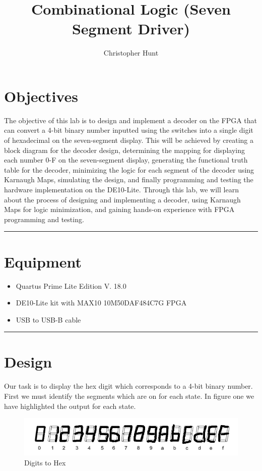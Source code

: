 \documentclass{article}
\title{\textbf{{\huge Combinational Logic (Seven Segment Driver)}}}
\author{Christopher Hunt}
\date{}
\begin{document}
\pagestyle{fancy}
\fancyhf{}
\rhead{\thepage}
\maketitle
\section*{\textcolor{mycolor}{Objectives}}
The objective of this lab is to design and implement a decoder on the FPGA that can convert a 4-bit binary number inputted using the switches into a single digit of hexadecimal on the seven-segment display. This will be achieved by creating a block diagram for the decoder design, determining the mapping for displaying each number 0-F on the seven-segment display, generating the functional truth table for the decoder, minimizing the logic for each segment of the decoder using Karnaugh Maps, simulating the design, and finally programming and testing the hardware implementation on the DE10-Lite. Through this lab, we will learn about the process of designing and implementing a decoder, using Karnaugh Maps for logic minimization, and gaining hands-on experience with FPGA programming and testing.
\vspace{5mm}
\hrule

\section*{\textcolor{mycolor}{Equipment}}
\begin{itemize}
\item Quartus Prime Lite Edition V. 18.0
\item DE10-Lite kit with MAX10 10M50DAF484C7G FPGA
\item USB to USB-B cable
\end{itemize}
\vspace{5mm}
\hrule

\section*{\textcolor{mycolor}{Design}}
Our task is to display the hex digit which corresponds to a 4-bit binary number. First we must identify the segments which are on for each state. In figure one we have highlighted the output for each state.

\begin{figure}[H]
  \centering
  \includegraphics[width=1\textwidth]{digits.png}
  \caption{Digits to Hex}
\end{figure}
\end{document}

